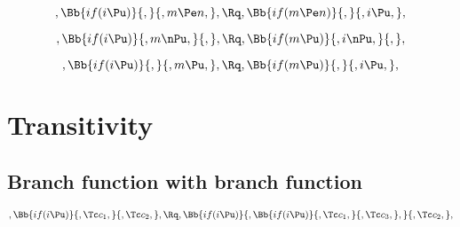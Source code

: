 \bigskip
\bigskip
\[, \Bb{if(i \Pu)}{,}{,m \Pe n,}, \Rq , \Bb{if(m \Pe n)}{,}{,i \Pu,},\]







\bigskip
\bigskip
\[, \Bb{if(i \Pu)}{,m \nPu,}{,}, \Rq , \Bb{if(m \Pu)}{,i \nPu,}{,},\]

\bigskip
\bigskip
\[, \Bb{if(i \Pu)}{,}{,m \Pu,}, \Rq , \Bb{if(m \Pu)}{,}{,i \Pu,},\]




\bigskip
\bigskip
\bigskip
\bigskip
\section{Transitivity}
\subsection{Branch function with branch function}
\[, \Bb{if(i \Pu)}{,\Tc c_1,}{,\Tc c_2,}, \Rq , \Bb{if(i \Pu)}{,\Bb{if(i \Pu)}{,\Tc c_1,}{,\Tc c_3,},}{,\Tc c_2,},\]

